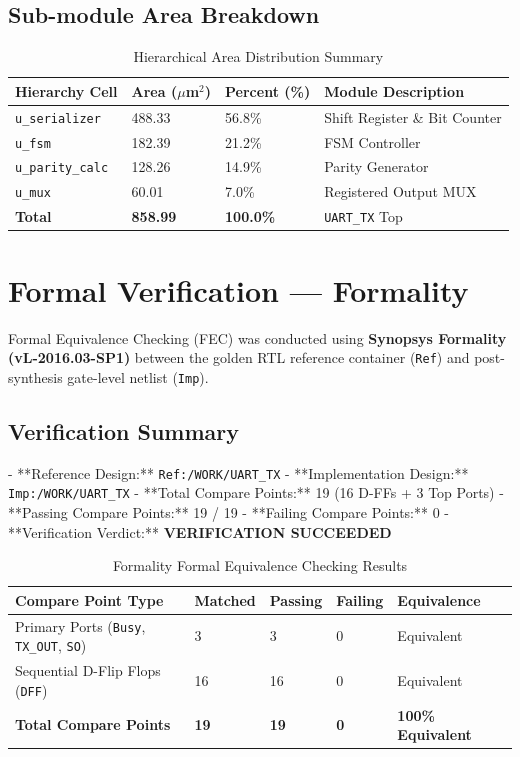 \documentclass[12pt,a4paper]{article}
\begin{document}
\subsection{Sub-module Area Breakdown}

\begin{table}[H]
\centering
\begin{tabular}{llll}
\toprule
\textbf{Hierarchy Cell} & \textbf{Area ($\mu$m$^2$)} & \textbf{Percent (\%)} & \textbf{Module Description} \\
\midrule
\texttt{u\_serializer} & 488.33 & 56.8\% & Shift Register \& Bit Counter \\
\texttt{u\_fsm}        & 182.39 & 21.2\% & FSM Controller \\
\texttt{u\_parity\_calc}& 128.26 & 14.9\% & Parity Generator \\
\texttt{u\_mux}        & 60.01  & 7.0\%  & Registered Output MUX \\
\midrule
\textbf{Total}         & \textbf{858.99} & \textbf{100.0\%} & \texttt{UART\_TX} Top \\
\bottomrule
\end{tabular}
\caption{Hierarchical Area Distribution Summary}
\end{table}

\section{Formal Verification — Formality}

Formal Equivalence Checking (FEC) was conducted using \textbf{Synopsys Formality (vL-2016.03-SP1)} between the golden RTL reference container (\texttt{Ref}) and post-synthesis gate-level netlist (\texttt{Imp}).

\subsection{Verification Summary}
- **Reference Design:** \texttt{Ref:/WORK/UART\_TX}
- **Implementation Design:** \texttt{Imp:/WORK/UART\_TX}
- **Total Compare Points:** 19 (16 D-FFs + 3 Top Ports)
- **Passing Compare Points:** 19 / 19
- **Failing Compare Points:** 0
- **Verification Verdict:** \textbf{VERIFICATION SUCCEEDED}

\begin{table}[H]
\centering
\begin{tabular}{lllll}
\toprule
\textbf{Compare Point Type} & \textbf{Matched} & \textbf{Passing} & \textbf{Failing} & \textbf{Equivalence} \\
\midrule
Primary Ports (\texttt{Busy}, \texttt{TX\_OUT}, \texttt{SO}) & 3 & 3 & 0 & Equivalent \\
Sequential D-Flip Flops (\texttt{DFF}) & 16 & 16 & 0 & Equivalent \\
\midrule
\textbf{Total Compare Points} & \textbf{19} & \textbf{19} & \textbf{0} & \textbf{100\% Equivalent} \\
\bottomrule
\end{tabular}
\caption{Formality Formal Equivalence Checking Results}
\end{table}
\end{document}
